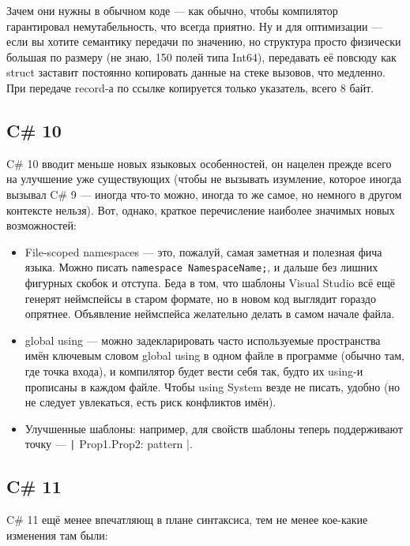 \documentclass{../../text-style}
\begin{document}
Зачем они нужны в обычном коде --- как обычно, чтобы компилятор гарантировал немутабельность, что всегда приятно. Ну и для оптимизации --- если вы хотите семантику передачи по значению, но структура просто физически большая по размеру (не знаю, 150 полей типа Int64), передавать её повсюду как struct заставит постоянно копировать данные на стеке вызовов, что медленно. При передаче record-а по ссылке копируется только указатель, всего 8 байт.

\subsection{C\# 10}

C\# 10 вводит меньше новых языковых особенностей, он нацелен прежде всего на улучшение уже существующих (чтобы не вызывать изумление, которое иногда вызывал C\# 9 --- иногда что-то можно, иногда то же самое, но немного в другом контексте нельзя). Вот, однако, краткое перечисление наиболее значимых новых возможностей:

\begin{itemize}
    \item File-scoped namespaces --- это, пожалуй, самая заметная и полезная фича языка. Можно писать \texttt{namespace NamespaceName;}, и дальше без лишних фигурных скобок и отступа. Беда в том, что шаблоны Visual Studio всё ещё генерят неймспейсы в старом формате, но в новом код выглядит гораздо опрятнее. Объявление неймспейса желательно делать в самом начале файла.
    \item global using --- можно задекларировать часто используемые пространства имён ключевым словом global using в одном файле в программе (обычно там, где точка входа), и компилятор будет вести себя так, будто их using-и прописаны в каждом файле. Чтобы using System везде не писать, удобно (но не следует увлекаться, есть риск конфликтов имён).
    \item Улучшенные шаблоны: например, для свойств шаблоны теперь поддерживают точку --- \texttt|{ Prop1.Prop2: pattern }|.
\end{itemize}

\subsection{C\# 11}

C\# 11 ещё менее впечатляющ в плане синтаксиса, тем не менее кое-какие изменения там были:
\end{document}
